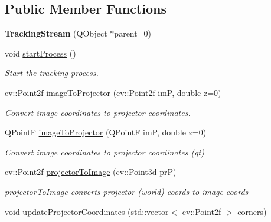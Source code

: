 \subsection*{Public Member Functions}
\begin{DoxyCompactItemize}
\item 
{\bfseries Tracking\+Stream} (Q\+Object $\ast$parent=0)\hypertarget{classTrackingStream_a6d7ef7c7fc262d4e0bc65315c266dd29}{}\label{classTrackingStream_a6d7ef7c7fc262d4e0bc65315c266dd29}

\item 
void \hyperlink{classTrackingStream_ad349c1e30fb253d5f0df097d16ccb665}{start\+Process} ()\hypertarget{classTrackingStream_ad349c1e30fb253d5f0df097d16ccb665}{}\label{classTrackingStream_ad349c1e30fb253d5f0df097d16ccb665}

\begin{DoxyCompactList}\small\item\em Start the tracking process. \end{DoxyCompactList}\item 
cv\+::\+Point2f \hyperlink{classTrackingStream_afca5f3b76819d9195ada29e0d7d2697b}{image\+To\+Projector} (cv\+::\+Point2f imP, double z=0)
\begin{DoxyCompactList}\small\item\em Convert image coordinates to projector coordinates. \end{DoxyCompactList}\item 
Q\+PointF \hyperlink{classTrackingStream_acf2d0509a86137709afca937984a0287}{image\+To\+Projector} (Q\+PointF imP, double z=0)
\begin{DoxyCompactList}\small\item\em Convert image coordinates to projector coordinates (qt) \end{DoxyCompactList}\item 
cv\+::\+Point2f \hyperlink{classTrackingStream_a1ba5b7036c99fb6da85d57c0db9b10dd}{projector\+To\+Image} (cv\+::\+Point3d prP)
\begin{DoxyCompactList}\small\item\em projector\+To\+Image converts projector (world) coords to image coords \end{DoxyCompactList}\item 
void \hyperlink{classTrackingStream_a6416cf962ab5f3726016504c59c2363a}{update\+Projector\+Coordinates} (std\+::vector$<$ cv\+::\+Point2f $>$ corners)\hypertarget{classTrackingStream_a6416cf962ab5f3726016504c59c2363a}{}\label{classTrackingStream_a6416cf962ab5f3726016504c59c2363a}


\end{DoxyCompactItemize}
